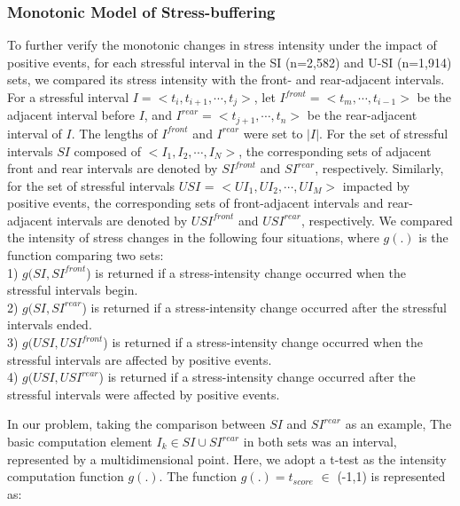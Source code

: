\documentclass[5p,times,numbers,authoryear]{elsarticle}
\begin{document}
\subsubsection{Monotonic Model of Stress-buffering}
\label{sec:mono}
To further verify the monotonic changes in stress intensity under the impact of positive events,
for each stressful interval in the SI (n=2,582) and U-SI (n=1,914) sets,
we compared its stress intensity with the front- and rear-adjacent intervals.
For a stressful interval $I = <t_i,t_{i+1},\cdots,t_j>$,
let $I^{front} = <t_m,\cdots,t_{i-1}>$ be the adjacent interval before $I$,
and $I^{rear} = <t_{j+1},\cdots,t_n>$ be the rear-adjacent interval of $I$.
The lengths of $I^{front}$ and $I^{rear}$ were set to $|I|$.
For the set of stressful intervals $SI$ composed of $<I_1,I_2,\cdots,I_N>$,
the corresponding sets of adjacent front and rear intervals are denoted by $SI^{front}$ and $SI^{rear}$, respectively.
Similarly, for the set of stressful intervals $USI$ = $<UI_1,UI_2,\cdots, UI_M>$ impacted by positive events,
the corresponding sets of front-adjacent intervals and rear-adjacent intervals are denoted by $USI^{front}$ and $USI^{rear}$, respectively.
We compared the intensity of stress changes in the following four situations,
where $g(.)$ is the function comparing two sets: \\
1) $g(SI,SI^{front}$) is returned if a stress-intensity change occurred when the stressful intervals begin.\\
2) $g(SI,SI^{rear}$) is returned if a stress-intensity change occurred after the stressful intervals ended.\\
3) $g(USI,USI^{front}$) is returned if a stress-intensity change occurred when the stressful intervals are affected by positive events.\\
4) $g(USI,USI^{rear}$) is returned if a stress-intensity change occurred after the stressful intervals were affected by positive events.

In our problem, taking the comparison between $SI$ and $SI^{rear}$ as an example,
The basic computation element $I_k \in SI \cup SI^{rear}$ in both sets was an interval, represented by a multidimensional point.
Here, we adopt a t-test as the intensity computation function $g(.)$.
The function $g(.) = t_{score}$ $\in$ (-1,1) is represented as:
\end{document}
